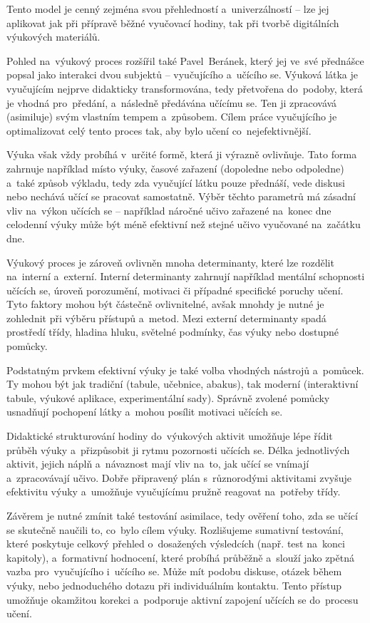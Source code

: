 \documentclass[male,czech,api_bc]{kitheses}
\begin{document}
Tento model je cenný zejména svou přehledností a~univerzálností – lze jej aplikovat jak při přípravě běžné vyučovací hodiny, tak při tvorbě digitálních výukových materiálů.

Pohled na~výukový proces rozšířil také Pavel~Beránek, který jej ve~své přednášce popsal jako interakci dvou subjektů – vyučujícího a~učícího se. Výuková látka je vyučujícím nejprve didakticky transformována, tedy přetvořena do~podoby, která je vhodná pro~předání, a~následně předávána učícímu se. Ten ji zpracovává (asimiluje) svým vlastním tempem a~způsobem. Cílem práce vyučujícího je optimalizovat celý tento proces tak, aby bylo učení co~nejefektivnější.

Výuka však vždy probíhá v~určité formě, která ji výrazně ovlivňuje. Tato forma zahrnuje například místo výuky, časové zařazení (dopoledne nebo odpoledne) a~také způsob výkladu, tedy zda vyučující látku pouze přednáší, vede diskusi nebo nechává učící se pracovat samostatně. Výběr těchto parametrů má zásadní vliv na~výkon učících se – například náročné učivo zařazené na~konec dne celodenní výuky může být méně efektivní než stejné učivo vyučované na~začátku dne.

Výukový proces je zároveň ovlivněn mnoha determinanty, které lze rozdělit na~interní a~externí. Interní determinanty zahrnují například mentální schopnosti učících se, úroveň porozumění, motivaci či případné specifické poruchy učení. Tyto faktory mohou být částečně ovlivnitelné, avšak mnohdy je nutné je zohlednit při výběru přístupů a~metod. Mezi externí determinanty spadá prostředí třídy, hladina hluku, světelné podmínky, čas výuky nebo dostupné pomůcky.

Podstatným prvkem efektivní výuky je také volba vhodných nástrojů a~pomůcek. Ty mohou být jak tradiční (tabule, učebnice, abakus), tak moderní (interaktivní tabule, výukové aplikace, experimentální sady). Správně zvolené pomůcky usnadňují pochopení látky a~mohou posílit motivaci učících se.

Didaktické strukturování hodiny do~výukových aktivit umožňuje lépe řídit průběh výuky a~přizpůsobit ji rytmu pozornosti učících se. Délka jednotlivých aktivit, jejich náplň a~návaznost mají vliv na~to, jak učící se vnímají a~zpracovávají učivo. Dobře připravený plán s~různorodými aktivitami zvyšuje efektivitu výuky a~umožňuje vyučujícímu pružně reagovat na~potřeby třídy.

Závěrem je nutné zmínit také testování asimilace, tedy ověření toho, zda se učící se skutečně naučili to, co~bylo cílem výuky. Rozlišujeme sumativní testování, které poskytuje celkový přehled o~dosažených výsledcích (např. test na~konci kapitoly), a~formativní hodnocení, které probíhá průběžně a~slouží jako zpětná vazba pro~vyučujícího i~učícího se. Může mít podobu diskuse, otázek během výuky, nebo jednoduchého dotazu při individuálním kontaktu. Tento přístup umožňuje okamžitou korekci a~podporuje aktivní zapojení učících se do~procesu učení.
\end{document}
